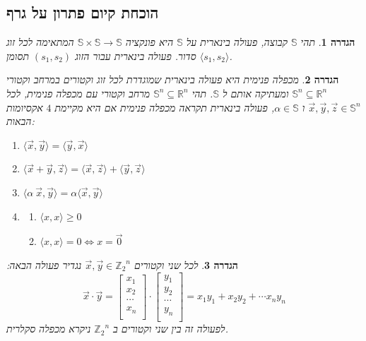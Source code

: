 \documentclass[12pt,leqno]{article}
\theoremstyle{theoremdd}
\newtheorem{definition}{הגדרה}[section]
\newcommand{\Zn}{{\mathbb{Z}_2}^n}
\begin{document}
\subsection{הוכחת קיום פתרון על גרף}
\begin{definition}
    תהי 
    $\mathbb{S}$
    קבוצה,
    פעולה בינארית על 
    $\mathbb{S}$
    היא פונקציה
    $\mathbb{S} \times \mathbb{S} \rightarrow \mathbb{S}$
    המתאימה לכל זוג 
    סדור.
    פעולה בינארית 
    עבור הזוג
    $(s_1, s_2)$
    תסומן
    $\langle s_1, s_2 \rangle$.
\end{definition}
\begin{definition}
    מכפלה פנימית 
    היא פעולה
    בינארית
    שמוגדרת לכל זוג וקטורים 
    במרחב וקטורי 
    $\mathbb{S}^n \subseteq \mathbb{R}^n$
    ומעתיקה אותם 
    ל
    $\mathbb{S}$.
    תהי 
    $\mathbb{S}^n \subseteq \mathbb{R}^n$
    מרחב וקטורי עם מכפלה פנימית,
    לכל
    $\vec x,\vec y,\vec z \in \mathbb{S}^n$
    ו
    $\alpha \in \mathbb{S}$,
    פעולה בינארית תקראה מכפלה פנימית אם היא מקיימת
    $4$
    אקסיומות
    הבאות:
    \begin{enumerate}
        \item 
        $\langle \vec x, \vec y \rangle = \langle \vec y,\vec x \rangle$
        \item 
        $\langle \vec x + \vec y, \vec z \rangle = \langle \vec x, \vec z \rangle + \langle \vec y, \vec z \rangle$
        \item 
        $\langle \alpha \ \vec x, \vec y \rangle = \alpha \langle \vec x, \vec y \rangle$
        \item 
        \begin{enumerate}
            \item 
            $\langle x, x \rangle \ge 0$ 
            \item 
            $\langle x, x \rangle = 0 \Longleftrightarrow  x = \vec{0}$ 
        \end{enumerate}
    \end{enumerate}
\end{definition}
\begin{definition}
    \label{def:inner_mul}
    לכל שני וקטורים
    $\vec x, \vec y \in \Zn$
    נגדיר פעולה הבאה:
    \begin{equation}
        \vec x \cdot \vec y = 
        \begin{bmatrix}
            x_1 \\
            x_2 \\
            \cdots \\
            x_n \\
        \end{bmatrix}
        \cdot 
        \begin{bmatrix}
            y_1 \\
            y_2 \\
            \cdots \\
            y_n \\
        \end{bmatrix}
        = 
        x_1 y_1 + x_2 y_2 + \cdots x_n y_n
    \end{equation}
    לפעולה זה
    בין שני וקטורים ב
    $\Zn$
    ניקרא מכפלה סקלרית. 
\end{definition}
\end{document}
